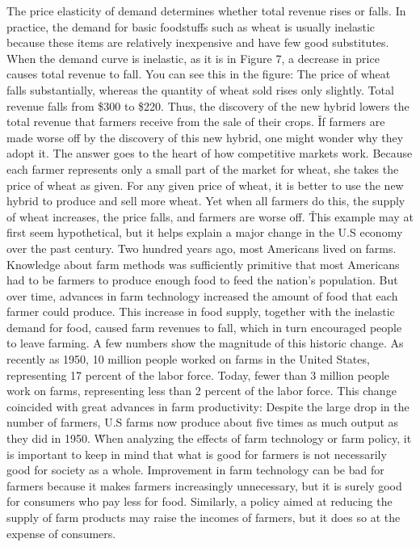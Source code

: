 The price elasticity of demand determines whether total revenue rises or falls. In practice, the demand for basic
foodstuffs such as wheat is usually inelastic because these items are relatively inexpensive and have few good
substitutes. When the demand curve is inelastic, as it is in Figure 7, a decrease in price causes total revenue to
fall. You can see this in the figure: The price of wheat falls substantially, whereas the quantity of wheat sold
rises only slightly. Total revenue falls from \$300 to \$220. Thus, the discovery of the new hybrid lowers the total
revenue that farmers receive from the sale of their crops. \v

If farmers are made worse off by the discovery of this new hybrid, one might wonder why they adopt it. The answer
goes to the heart of how competitive markets work. Because each farmer represents only a small part of the market for
wheat, she takes the price of wheat as given. For any given price of wheat, it is better to use the new hybrid to
produce and sell more wheat. Yet when all farmers do this, the supply of wheat increases, the price falls, and
farmers are worse off. \v

This example may at first seem hypothetical, but it helps explain a major change in the U.S economy over the past
century. Two hundred years ago, most Americans lived on farms. Knowledge about farm methods was sufficiently
primitive that most Americans had to be farmers to produce enough food to feed the nation's population. But over
time, advances in farm technology increased the amount of food that each farmer could produce. This increase in food
supply, together with the inelastic demand for food, caused farm revenues to fall, which in turn encouraged people to
leave farming. A few numbers show the magnitude of this historic change. As recently as 1950, 10 million people
worked on farms in the United States, representing 17 percent of the labor force. Today, fewer than 3 million people
work on farms, representing less than 2 percent of the labor force. This change coincided with great advances in farm
productivity: Despite the large drop in the number of farmers, U.S farms now produce about five times as much output
as they did in 1950. \v

When analyzing the effects of farm technology or farm policy, it is important to keep in mind that what is good for
farmers is not necessarily good for society as a whole. Improvement in farm technology can be bad for farmers because
it makes farmers increasingly unnecessary, but it is surely good for consumers who pay less for food. Similarly, a
policy aimed at reducing the supply of farm products may raise the incomes of farmers, but it does so at the expense
of consumers.

